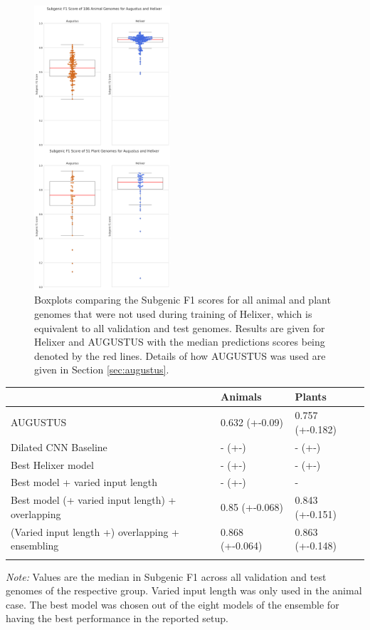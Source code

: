 \documentclass{bioinfo}
\begin{document}
\begin{figure}[!tpb]
\centerline{\includegraphics[width=0.45\textwidth]{images/overall_boxplot}}
\caption{Boxplots comparing the Subgenic F1 scores for all animal and plant genomes that were not used during training of Helixer, which is equivalent to all validation and test genomes. Results are given for Helixer and AUGUSTUS with the median predictions scores being denoted by the red lines. Details of how AUGUSTUS was used are given in Section \ref{sec:augustus}.}\label{fig:boxplot}
\end{figure}

\begin{table}[!t]
 {
\begin{tabular}{@{}lll@{}}
\toprule & Animals & Plants\\
\midrule
AUGUSTUS & 0.632 (+-0.09) & 0.757 (+-0.182)\\
Dilated CNN Baseline & - (+-) & - (+-)\\
Best Helixer model & - (+-) & - (+-) \\
Best model + varied input length & - (+-) & - \\
Best model (+ varied input length) + overlapping &  0.85 (+-0.068) & 0.843 (+-0.151) \\
(Varied input length +) overlapping + ensembling & 0.868 (+-0.064) & 0.863 (+-0.148) \\
\botrule
\end{tabular}}{{\it Note:} Values are the median in Subgenic F1 across all validation and test genomes of the respective group. Varied input length was only used in the animal case. The best model was chosen out of the eight models of the ensemble for having the best performance in the reported setup.}
\end{table}
\end{document}
